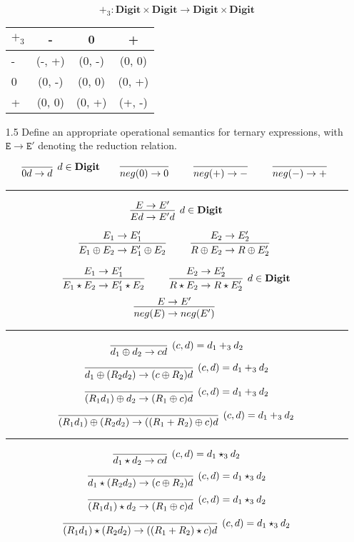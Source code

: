 \documentclass[a4paper,10pt]{article}
\newcommand{\E}{\mathtt{E}}
\newcommand{\Digit}{\mathbf{Digit}}
\newcommand{\question}[1]
{\color{DarkBlue}#1 \color{Black} \newline}
\begin{document}
\begin{enumerate}
\begin{table}[h!]
    \centering
	
	$$ +_3 : \Digit \times \Digit \to \Digit \times \Digit$$ 

	\begin{tabular}{l | c c c}
	$+_3$ & - & 0 & + \\
	\hline
	- & (-, +) & (0, -) & (0, 0) \\
	0 & (0, -) & (0, 0) & (0, +) \\
	+ & (0, 0) & (0, +) & (+, -) \\
	\end{tabular}
\end{table}

\question{
\item[1.5] Define an appropriate operational semantics for ternary expressions, 
with $\E \to \E'$ denoting the reduction relation.
}

\[
\infer[d \in \Digit]
  {0d \rightarrow d}
  {}   
\qquad
\infer[] 
  {neg(0) \rightarrow 0}  
  {}    
\qquad
\infer[] 
  {neg(+) \rightarrow -}  
  {}    
\qquad
\infer[] 
  {neg(-) \rightarrow +}  
  {}    
\]

\hrule

\[
\infer[d \in \Digit]
  {Ed \rightarrow E'd}
  {E \rightarrow E'}
\]

\[
\infer[]
  {E_{1} \oplus E_{2} \rightarrow E_{1}' \oplus E_{2}}
  {E_{1} \rightarrow E_{1}'} 
\qquad
\infer[]
  {R \oplus E_{2} \rightarrow R \oplus E_{2}'}
  {E_{2} \rightarrow E_{2}'}
\]

\[
\infer[]
  {E_{1} \star E_{2} \rightarrow E_{1}' \star E_{2}}
  {E_{1} \rightarrow E_{1}'} 
\qquad
\infer[d \in \Digit]
  {R \star E_{2} \rightarrow R \star E_{2}'}
  {E_{2} \rightarrow E_{2}'}
\]
\[
\infer[]
  {neg(E) \rightarrow neg(E')}
  {E \rightarrow E'}
\]

\hrule

\[
\infer[(c, d) = d_{1} +_3 d_{2}] 
  {d_{1} \oplus d_{2} \rightarrow cd}
  {}  
\]
\[
\infer[(c, d) = d_{1} +_3 d_{2}] 
  {d_{1} \oplus (R_{2} d_{2}) \rightarrow (c \oplus R_{2}) d}
  {}  
\]
\[
\infer[(c, d) = d_{1} +_3 d_{2}] 
  {(R_{1} d_{1}) \oplus d_{2}  \rightarrow (R_{1} \oplus c) d}
  {}  
\]
\[
\infer[(c, d) = d_{1} +_3 d_{2}] 
  {(R_{1} d_{1}) \oplus (R_{2} d_{2}) \rightarrow ((R_{1} + R_{2}) \oplus c) d}
  {}  
\]

\hrule

\[
\infer[(c, d) = d_{1} \star_{3} d_{2}] 
  {d_{1} \star d_{2} \rightarrow cd}
  {}  
\]
\[
\infer[(c, d) = d_{1} \star_{3} d_{2}] 
  {d_{1} \star (R_{2} d_{2}) \rightarrow (c \oplus R_{2}) d}
  {}  
\]
\[
\infer[(c, d) = d_{1} \star_{3} d_{2}] 
  {(R_{1} d_{1}) \star d_{2}  \rightarrow (R_{1} \oplus c) d}
  {}  
\]
\[
\infer[(c, d) = d_{1} \star_{3} d_{2}] 
  {(R_{1} d_{1}) \star (R_{2} d_{2}) \rightarrow ((R_{1} + R_{2}) \star c) d}
  {}  
\]


\end{enumerate}
\end{document}
